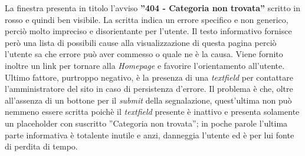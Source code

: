 \documentclass[../Relazione.tex]{subfiles}
\begin{document}
		La finestra presenta in titolo l'avviso \textbf{''404 - Categoria non trovata''} scritto in rosso e quindi ben visibile.
		La scritta indica un errore specifico e non generico, perciò molto impreciso e disorientante per l'utente.
		Il testo informativo fornisce però una lista di possibili cause alla visualizzazione di questa pagina perciò l'utente sa che errore può aver commesso o quale ne è la causa.
		Viene fornito inoltre un link per tornare alla \emph{Homepage} e favorire l'orientamento all'utente.
		Ultimo fattore, purtroppo negativo, è la presenza di una \emph{textfield} per contattare l'amministratore del sito in caso di persistenza d'errore.
		Il problema è che, oltre all'assenza di un bottone per il \emph{submit} della segnalazione, quest'ultima non può nemmeno essere scritta poichè il \emph{textfield} presente è inattivo e presenta solamente un placeholder con suscritto ''Categoria non trovata''; in poche parole l'ultima parte informativa è totalente inutile e anzi, danneggia l'utente ed è per lui fonte di perdita di tempo.
\end{document}
